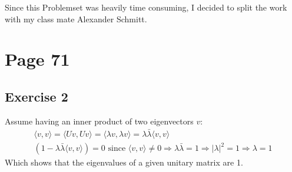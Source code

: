 Since this Problemset was heavily time consuming, I decided to split the work with my class mate Alexander Schmitt.
\section{Page 71}
\subsection{Exercise 2}
Assume having an inner product of two eigenvectors $v$:
\begin{gather*}
\langle v,v \rangle = \langle Uv,Uv \rangle = \langle \lambda v,\lambda v \rangle = \lambda \bar{\lambda} \langle v,v \rangle\\
\left( 1- \lambda\bar{\lambda} \langle v,v \rangle \right) = 0 \text{ since } \langle v,v \rangle \neq 0 \Rightarrow \lambda\bar{\lambda} =1 \Rightarrow |\lambda|^2 =1 \Rightarrow \lambda = 1
\end{gather*}
Which shows that the eigenvalues of a given unitary matrix are 1.
